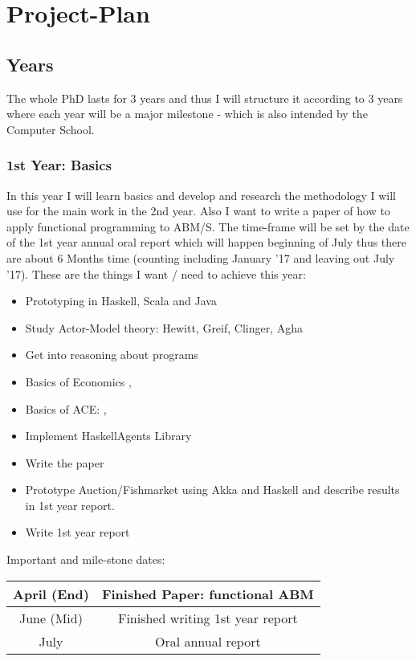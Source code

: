 \section{Project-Plan}

\subsection{Years}
The whole PhD lasts for 3 years and thus I will structure it according to 3 years where each year will be a major milestone - which is also intended by the Computer School.

\subsubsection{1st Year: Basics}
In this year I will learn basics and develop and research the methodology I will use for the main work in the 2nd year. Also I want to write a paper of how to apply functional programming to ABM/S. The time-frame will be set by the date of the 1st year annual oral report which will happen beginning of July thus there are about 6 Months time (counting including January '17 and leaving out July '17). These are the things I want / need to achieve this year:

\begin{itemize}
\item Prototyping in Haskell, Scala and Java
\item Study Actor-Model theory: Hewitt, Greif, Clinger, Agha
\item Get into reasoning about programs
\item Basics of Economics \cite{bowles_understanding_2005}, 
\item Basics of ACE: \cite{KirmanComplex2010}, \cite{Darley2007}
\item Implement HaskellAgents Library
\item Write the paper
\item Prototype Auction/Fishmarket using Akka and Haskell and describe results in 1st year report.
\item Write 1st year report
\end{itemize}

Important and mile-stone dates:

\begin{center}
\begin{tabular}{ c|c } 
	April (End) & Finished Paper: functional ABM \\ 
	\hline
	June (Mid) & Finished writing 1st year report  \\ 
	\hline
	July & Oral annual report \\
\end{tabular}
\end{center}

